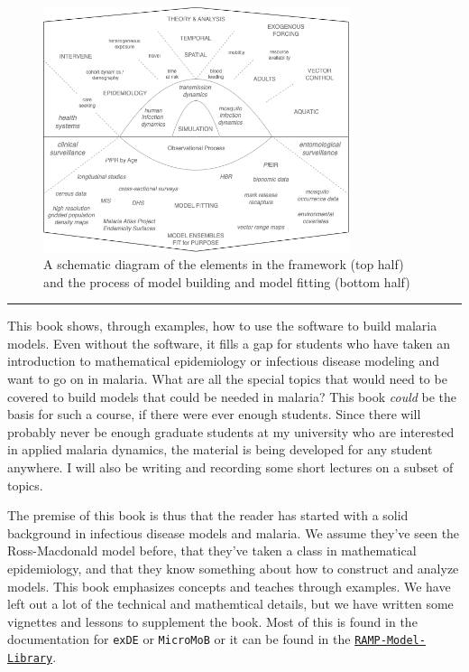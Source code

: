 \documentclass[
]{book}
\begin{document}
\begin{figure}
\centering
\includegraphics[width=0.8\textwidth,height=\textheight]{Figures/ScalableComplexity.png}
\caption{A schematic diagram of the elements in the framework (top half) and the process of model building and model fitting (bottom half)}
\end{figure}

\begin{center}\rule{0.5\linewidth}{0.5pt}\end{center}

This book shows, through examples, how to use the software to build malaria models.
Even without the software, it fills a gap for students who have taken an introduction to mathematical epidemiology or infectious disease modeling and want to go on in malaria.
What are all the special topics that would need to be covered to build models that could be needed in malaria?
This book \emph{could} be the basis for such a course, if there were ever enough students.
Since there will probably never be enough graduate students at my university who are interested in applied malaria dynamics, the material is being developed for any student anywhere.
I will also be writing and recording some short lectures on a subset of topics.

The premise of this book is thus that the reader has started with a solid background in infectious disease models and malaria. We assume they've seen the Ross-Macdonald model before, that they've taken a class in mathematical epidemiology, and that they know something about how to construct and analyze models. This book emphasizes concepts and teaches through examples. We have left out a lot of the technical and mathemtical details, but we have written some vignettes and lessons to supplement the book. Most of this is found in the documentation for \texttt{exDE} or \texttt{MicroMoB} or it can be found in the \href{../../RAMP-Model-Library/RAMP-Model-Library.html}{\texttt{RAMP-Model-Library}}.
\end{document}
